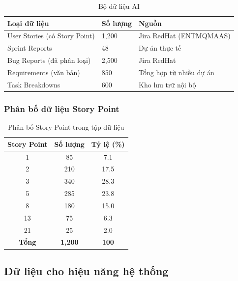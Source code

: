 \documentclass[12pt,a4paper]{report}
\begin{document}
\begin{table}[H]
\centering
\caption{Bộ dữ liệu AI}
\begin{tabular}{|p{4cm}|p{4.5cm}|p{5cm}|}
\hline
\textbf{Loại dữ liệu} & \textbf{Số lượng} & \textbf{Nguồn} \\
\hline
User Stories (có Story Point) & 1,200 & Jira RedHat (ENTMQMAAS) \\
\hline
Sprint Reports & 48 & Dự án thực tế \\
\hline
Bug Reports (đã phân loại) & 2,500 & Jira RedHat \\
\hline
Requirements (văn bản) & 850 & Tổng hợp từ nhiều dự án \\
\hline
Task Breakdowns & 600 & Kho lưu trữ nội bộ \\
\hline
\end{tabular}
\label{tab:ai_dataset}
\end{table}

\subsubsection{Phân bố dữ liệu Story Point}

\begin{table}[H]
\centering
\caption{Phân bố Story Point trong tập dữ liệu}
\begin{tabular}{|c|c|c|}
\hline
\textbf{Story Point} & \textbf{Số lượng} & \textbf{Tỷ lệ (\%)} \\
\hline
1 & 85 & 7.1 \\
\hline
2 & 210 & 17.5 \\
\hline
3 & 340 & 28.3 \\
\hline
5 & 285 & 23.8 \\
\hline
8 & 180 & 15.0 \\
\hline
13 & 75 & 6.3 \\
\hline
21 & 25 & 2.0 \\
\hline
\textbf{Tổng} & \textbf{1,200} & \textbf{100} \\
\hline
\end{tabular}
\label{tab:sp_distribution}
\end{table}

\subsection{Dữ liệu cho hiệu năng hệ thống}
\end{document}
